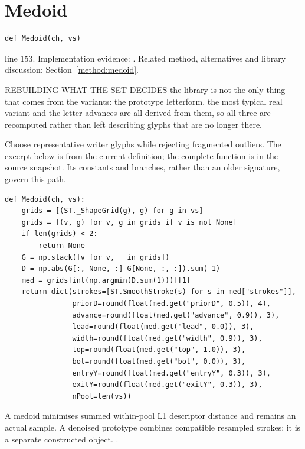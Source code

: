 \section{Medoid}\label{fn:curate:Medoid}
\begin{lstlisting}[style=sig]
def Medoid(ch, vs)
\end{lstlisting}
 line 153. Implementation evidence: \cite{code2026}. Related method, alternatives and library discussion: Section~\ref{method:medoid}.


REBUILDING WHAT THE SET DECIDES the library is not the only thing that comes from the variants: the prototype letterform, the most typical real variant and the letter advances are all derived from them, so all three are recomputed rather than left describing glyphs that are no longer there.


Choose representative writer glyphs while rejecting fragmented outliers. The excerpt below is from the current definition; the complete function is in the source snapshot. Its constants and branches, rather than an older signature, govern this path.


\begin{lstlisting}[style=plain]
def Medoid(ch, vs):
    grids = [(ST._ShapeGrid(g), g) for g in vs]
    grids = [(v, g) for v, g in grids if v is not None]
    if len(grids) < 2:
        return None
    G = np.stack([v for v, _ in grids])
    D = np.abs(G[:, None, :]-G[None, :, :]).sum(-1)
    med = grids[int(np.argmin(D.sum(1)))][1]
    return dict(strokes=[ST.SmoothStroke(s) for s in med["strokes"]],
                priorD=round(float(med.get("priorD", 0.5)), 4),
                advance=round(float(med.get("advance", 0.9)), 3),
                lead=round(float(med.get("lead", 0.0)), 3),
                width=round(float(med.get("width", 0.9)), 3),
                top=round(float(med.get("top", 1.0)), 3),
                bot=round(float(med.get("bot", 0.0)), 3),
                entryY=round(float(med.get("entryY", 0.3)), 3),
                exitY=round(float(med.get("exitY", 0.3)), 3),
                nPool=len(vs))
\end{lstlisting}
A medoid minimises summed within-pool L1 descriptor distance and remains an actual sample. A denoised prototype combines compatible resampled strokes; it is a separate constructed object. \cite{code2026,haines2016}.


